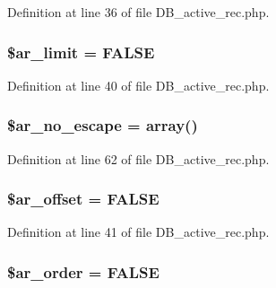 Definition at line 36 of file D\-B\-\_\-active\-\_\-rec.\-php.

\hypertarget{class_c_i___d_b__active__record_afd3444376e2806c184aec39da01adad5}{
\subsubsection[{\$ar\-\_\-limit}]{\setlength{\rightskip}{0pt plus 5cm}\$ar\-\_\-limit = F\-A\-L\-S\-E}}\label{class_c_i___d_b__active__record_afd3444376e2806c184aec39da01adad5}


Definition at line 40 of file D\-B\-\_\-active\-\_\-rec.\-php.

\hypertarget{class_c_i___d_b__active__record_a7c12214d4cda06a8278405a5841fb096}{
\subsubsection[{\$ar\-\_\-no\-\_\-escape}]{\setlength{\rightskip}{0pt plus 5cm}\$ar\-\_\-no\-\_\-escape = array()}}\label{class_c_i___d_b__active__record_a7c12214d4cda06a8278405a5841fb096}


Definition at line 62 of file D\-B\-\_\-active\-\_\-rec.\-php.

\hypertarget{class_c_i___d_b__active__record_a0b62c5aa489250b693f22a50ea6b2094}{
\subsubsection[{\$ar\-\_\-offset}]{\setlength{\rightskip}{0pt plus 5cm}\$ar\-\_\-offset = F\-A\-L\-S\-E}}\label{class_c_i___d_b__active__record_a0b62c5aa489250b693f22a50ea6b2094}


Definition at line 41 of file D\-B\-\_\-active\-\_\-rec.\-php.

\hypertarget{class_c_i___d_b__active__record_a3aac663f32333aebe197788ecb20a469}{
\subsubsection[{\$ar\-\_\-order}]{\setlength{\rightskip}{0pt plus 5cm}\$ar\-\_\-order = F\-A\-L\-S\-E}}\label{class_c_i___d_b__active__record_a3aac663f32333aebe197788ecb20a469}


